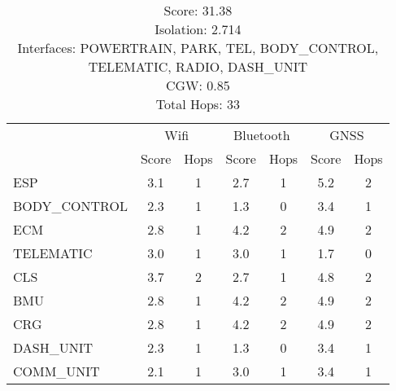 \newpage

\begin{table}[ht]
    \centering
    \caption{ \\ Score: 31.38 \\ Isolation: 2.714 \\ Interfaces: POWERTRAIN, PARK, TEL, BODY\_CONTROL, TELEMATIC, RADIO, DASH\_UNIT \\ CGW: 0.85 \\ Total Hops: 33}
    \label{tab:arch9}
    \begin{tabular}{lcccccc}
    \hline
    & \multicolumn{2}{c}{Wifi} & \multicolumn{2}{c}{Bluetooth} & \multicolumn{2}{c}{GNSS} \\
    & Score & Hops & Score & Hops & Score & Hops \\
    \hline
        ESP & 3.1 & 1 & 2.7 & 1 & 5.2 & 2 \\
        BODY\_CONTROL & 2.3 & 1 & 1.3 & 0 & 3.4 & 1 \\
        ECM & 2.8 & 1 & 4.2 & 2 & 4.9 & 2 \\
        TELEMATIC & 3.0 & 1 & 3.0 & 1 & 1.7 & 0 \\
        CLS & 3.7 & 2 & 2.7 & 1 & 4.8 & 2 \\
        BMU & 2.8 & 1 & 4.2 & 2 & 4.9 & 2 \\
        CRG & 2.8 & 1 & 4.2 & 2 & 4.9 & 2 \\
        DASH\_UNIT & 2.3 & 1 & 1.3 & 0 & 3.4 & 1 \\
        COMM\_UNIT & 2.1 & 1 & 3.0 & 1 & 3.4 & 1 \\
    \hline
    \end{tabular}
\end{table}


